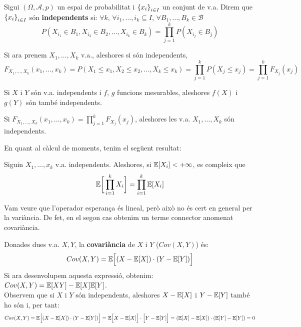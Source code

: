 \begin{defi}
  Sigui $(\Omega, \mathcal{A}, p)$ un espai de probabilitat i $\left\{x_{i}\right\}_{i\in I}$ un conjunt de v.a. 
  Direm que $\left\{x_{i}\right\}_{i\in I}$ són \textbf{independents} si: $\forall k, \, \forall {i_{1}, \ldots, i_{k}} 
  \subseteq I, \, \forall B_{1}, \ldots, B_{k} \in \mathcal{B}$
  \[
    P(X_{i_{1}} \in B_{1}, X_{i_{2}}\in B_{2}, \ldots , X_{i_{k}}\in B_{k}) = \prod\limits_{j=1}^{k}P(X_{i_{j}}\in B_{j})
  \]
  
  Si ara prenem $X_{1}, \ldots, X_{k}$ v.a., aleshores si són independents, 
  \[
    F_{X_{1}, \ldots, X_{k}}(x_{1}, \dots, x_{k}) = P(X_{1} \leq x_{1}, X_{2} \leq x_{2}, \ldots , X_{k} \leq x_{k}) = 
    \prod\limits_{j=1}^{k}P(X_{j} \leq x_{j}) = \prod\limits_{j=1}^{k}F_{X_{j}}(x_{j})
  \]
\end{defi}

\newpage

\begin{obs}
  Si $X$ i $Y$ són v.a. independents i $f,\, g$ funcions mesurables, aleshores $f(X)$ i $g(Y)$ són també independents.
\end{obs}

\begin{obs}
  Si $F_{X_{1}, \ldots, X_{k}}(x_{1}, \dots, x_{k}) = \prod\limits_{j=1}^{k}F_{X_{j}}(x_{j})$, aleshores 
  les v.a. $X_{1}, \ldots , X_{k}$ són independents.
\end{obs}

En quant al càlcul de moments, tenim el següent resultat:

\begin{thm}
  Siguin $X_{1}, \ldots, x_{k}$ v.a. independents. Aleshores, si $\mathbb{E}[X_{i}] < +\infty$, es compleix que 
  $$\mathbb{E}\bigg[\prod\limits_{i=1}^{k}X_{i} \bigg] = \prod\limits_{i=1}^{k}\mathbb{E}[X_{i}]$$
\end{thm}

Vam veure que l'operador esperança és lineal, però això no és cert en general per la variància. De fet, 
en el segon cas obtenim un terme connector anomenat covariància.

\begin{defi}
  Donades dues v.a. $X,Y$, la \textbf{covariància} de $X$ i $Y$ ($Cov(X,Y)$) és:
  \[
    Cov(X,Y) = \mathbb{E}\Big[(X-\mathbb{E}[X])\cdot (Y-\mathbb{E}[Y]) \Big]
  \]
  Si ara desenvolupem aquesta expressió, obtenim: $Cov(X,Y) = \mathbb{E}[XY] - \mathbb{E}[X]\mathbb{E}[Y]$. \\
  
  Observem que si $X$ i $Y$ són independents, aleshores $X - \mathbb{E}[X]$ i $Y - \mathbb{E}[Y]$ també ho són i, per tant:
  \[
    Cov(X,Y) = \mathbb{E}\Big[(X-\mathbb{E}[X])\cdot (Y-\mathbb{E}[Y]) \Big] = \mathbb{E}\Big[X-\mathbb{E}[X]\Big]\cdot \Big[Y-\mathbb{E}[Y] \Big] = (\mathbb{E}[X] - \mathbb{E}[X]) \cdot (\mathbb{E}[Y] - \mathbb{E}[Y]) = 0
  \]
\end{defi}

